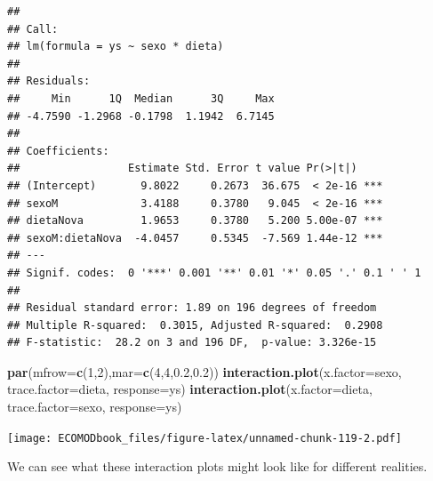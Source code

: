 \documentclass[
]{book}
\newenvironment{Shaded}{\begin{snugshade}}{\end{snugshade}}
\newcommand{\DataTypeTok}[1]{\textcolor[rgb]{0.13,0.29,0.53}{#1}}
\newcommand{\DecValTok}[1]{\textcolor[rgb]{0.00,0.00,0.81}{#1}}
\newcommand{\FloatTok}[1]{\textcolor[rgb]{0.00,0.00,0.81}{#1}}
\newcommand{\KeywordTok}[1]{\textcolor[rgb]{0.13,0.29,0.53}{\textbf{#1}}}
\newcommand{\NormalTok}[1]{#1}
\begin{document}
\begin{verbatim}
## 
## Call:
## lm(formula = ys ~ sexo * dieta)
## 
## Residuals:
##     Min      1Q  Median      3Q     Max 
## -4.7590 -1.2968 -0.1798  1.1942  6.7145 
## 
## Coefficients:
##                 Estimate Std. Error t value Pr(>|t|)    
## (Intercept)       9.8022     0.2673  36.675  < 2e-16 ***
## sexoM             3.4188     0.3780   9.045  < 2e-16 ***
## dietaNova         1.9653     0.3780   5.200 5.00e-07 ***
## sexoM:dietaNova  -4.0457     0.5345  -7.569 1.44e-12 ***
## ---
## Signif. codes:  0 '***' 0.001 '**' 0.01 '*' 0.05 '.' 0.1 ' ' 1
## 
## Residual standard error: 1.89 on 196 degrees of freedom
## Multiple R-squared:  0.3015,	Adjusted R-squared:  0.2908 
## F-statistic:  28.2 on 3 and 196 DF,  p-value: 3.326e-15
\end{verbatim}

\begin{Shaded}
\begin{Highlighting}[]
\KeywordTok{par}\NormalTok{(}\DataTypeTok{mfrow=}\KeywordTok{c}\NormalTok{(}\DecValTok{1}\NormalTok{,}\DecValTok{2}\NormalTok{),}\DataTypeTok{mar=}\KeywordTok{c}\NormalTok{(}\DecValTok{4}\NormalTok{,}\DecValTok{4}\NormalTok{,}\FloatTok{0.2}\NormalTok{,}\FloatTok{0.2}\NormalTok{))}
\KeywordTok{interaction.plot}\NormalTok{(}\DataTypeTok{x.factor=}\NormalTok{sexo, }\DataTypeTok{trace.factor=}\NormalTok{dieta, }\DataTypeTok{response=}\NormalTok{ys)}
\KeywordTok{interaction.plot}\NormalTok{(}\DataTypeTok{x.factor=}\NormalTok{dieta, }\DataTypeTok{trace.factor=}\NormalTok{sexo, }\DataTypeTok{response=}\NormalTok{ys)}
\end{Highlighting}
\end{Shaded}

\texttt{[image: ECOMODbook\_files/figure-latex/unnamed-chunk-119-2.pdf]}

We can see what these interaction plots might look like for different realities.
\end{document}
